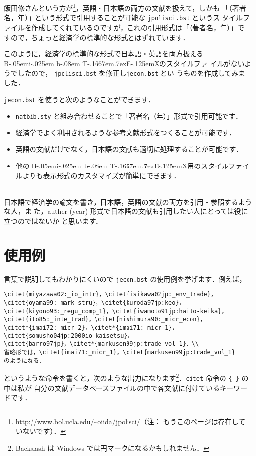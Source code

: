\documentclass[a4j,10pt]{jarticle}
\def\BibTeX{{\rm B\kern-.05em{\sc i\kern-.025em b}\kern-.08em
    T\kern-.1667em\lower.7ex\hbox{E}\kern-.125emX}}
\begin{document}
飯田修さんという方が\footnote{\url{http://www.bol.ucla.edu/~oiida/jpolisci/}（注：
もうこのページは存在していないです）．}，英語・日本語の両方の文献を扱えて，しかも
「（著者名，年）」という形式で引用することが可能な \texttt{jpolisci.bst} というス
タイルファイルを作成してくれているのですが，これの引用形式は「（著者名，年）」で
すので，ちょっと経済学の標準的な形式とはずれています．

このように，経済学の標準的な形式で日本語・英語を両方扱える \BibTeX のスタイルファ
イルがないようでしたので， \texttt{jpolisci.bst} を修正し\texttt{jecon.bst} とい
うものを作成してみました．
\vspace*{1em}

\texttt{jecon.bst} を使うと次のようなことができます．
\\

\begin{screen}
 \begin{itemize}
 \item \texttt{natbib.sty} と組み合わせることで「著者名（年）」形式で引用可能です．
 \item 経済学でよく利用されるような参考文献形式をつくることが可能です．
 \item 英語の文献だけでなく，日本語の文献も適切に処理することが可能です．
 \item 他の \BibTeX 用のスタイルファイルよりも表示形式のカスタマイズが簡単にできます．
 \end{itemize}
\end{screen}
\\

日本語で経済学の論文を書き，日本語，英語の文献の両方を引用・参照するような人，ま
た，author (year) 形式で日本語の文献も引用したい人にとっては役に立つのではないか
と思います．

\section{使用例}

言葉で説明してもわかりにくいので \texttt{jecon.bst} の使用例を挙げます．例えば，
\begin{screen}
\begin{verbatim}
\citet{miyazawa02:_io_intr}，\citet{isikawa02jp:_env_trade}，
\citet{oyama99:_mark_stru}，\citet{kuroda97jp:keo}，
\citet{kiyono93:_regu_comp_1}，\citet{iwamoto91jp:haito-keika}，
\citet{ito85:_inte_trad}，\citet{nishimura90:_micr_econ}，
\citet*{imai72:_micr_2}，\citet*{imai71:_micr_1}，
\citet{somusho04jp:2000io-kaisetsu}，
\citet{barro97jp}，\citet*{markusen99jp:trade_vol_1}．\\
省略形では，\citet{imai71:_micr_1}，\citet{markusen99jp:trade_vol_1}
のようになる．
\end{verbatim}
\end{screen}
というような命令を書くと，次のような出力になります\footnote{Backslash は Windows
では円マークになるかもしれません．}．\texttt{citet} 命令の \verb|{ }| の中は私が
自分の文献データベースファイルの中で各文献に付けているキーワードです．
\end{document}

